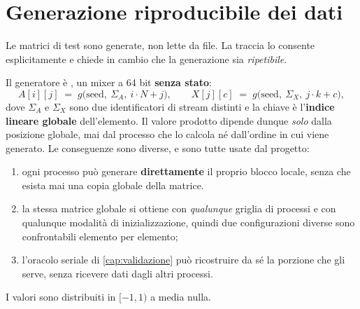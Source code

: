 \section{Generazione riproducibile dei dati}
\label{sec:generazione}

\color{red}

Le matrici di test sono generate, non lette da file. La traccia lo consente
esplicitamente e chiede in cambio che la generazione sia \emph{ripetibile}.

Il generatore è , un mixer a 64 bit \textbf{senza stato}:
\begin{equation}
  A[i][j] \;=\; g\bigl(\text{seed},\ \Sigma_A,\ i \cdot N + j \bigr),
  \qquad
  X[j][c] \;=\; g\bigl(\text{seed},\ \Sigma_X,\ j \cdot k + c \bigr),
  \label{eq:gen}
\end{equation}
dove $\Sigma_A$ e $\Sigma_X$ sono due identificatori di stream distinti e la
chiave è l'\textbf{indice lineare globale} dell'elemento. Il valore prodotto
dipende dunque \emph{solo} dalla posizione globale, mai dal processo che lo calcola né
dall'ordine in cui viene generato.
Le conseguenze sono diverse, e sono tutte usate dal progetto:

\begin{enumerate}[nosep,left=0pt]
  \item ogni processo pu\`o generare \textbf{direttamente} il proprio blocco
        locale, senza che esista mai una copia globale della matrice. 

  \item la stessa matrice globale si ottiene con \emph{qualunque} griglia di
        processi e con qualunque modalit\`a di inizializzazione, quindi due
        configurazioni diverse sono confrontabili elemento per elemento;
  \item l'oracolo seriale di \cref{cap:validazione} pu\`o ricostruire da s\'e la
        porzione che gli serve, senza ricevere dati dagli altri processi.
\end{enumerate}

I valori sono distribuiti in $[-1, 1)$ a media nulla.

\color{black}
